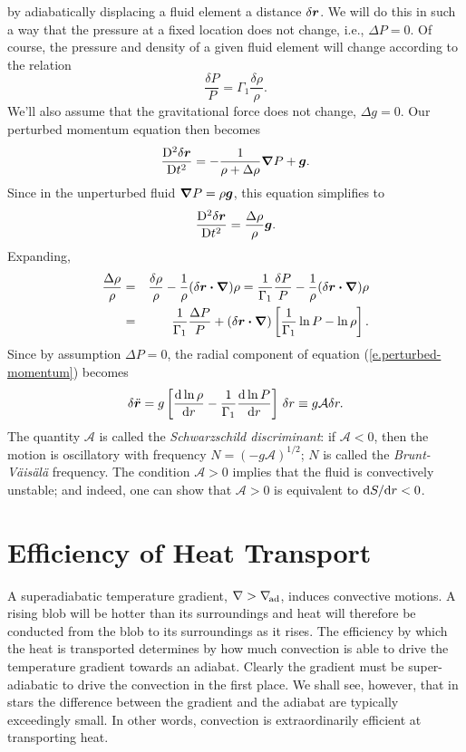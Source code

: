  by adiabatically displacing a fluid element a distance $\delta\bm{r}$.  We will do this in such a way that the pressure at a fixed location does not change, i.e., $\Delta P = 0$. Of course, the pressure and density of a given fluid element will change according to the relation
\[
\frac{\delta P}{P} = \Gamma_{1}\frac{\delta\rho}{\rho}.
\]
We'll also assume that the gravitational force does not change, $\Delta g = 0$.  Our perturbed momentum equation then becomes
\[
\frac{\mathrm{D}^{2}\delta\bm{r}}{\mathrm{D} t^{2}} = -\frac{1}{\rho + \Delta \rho}\bm{\nabla} P+ \bm{g}.
\]
Since in the unperturbed fluid $\bm{\nabla} P = \rho\bm{g}$, this equation simplifies to
\begin{equation}\label{e.perturbed-momentum}
\frac{\mathrm{D}^{2}\delta\bm{r}}{\mathrm{D} t^{2}} = \frac{\Delta \rho}{\rho}\bm{g}.
\end{equation}
Expanding,
\begin{eqnarray*}
\frac{\Delta \rho}{\rho} &=& \frac{\delta \rho}{\rho} - \frac{1}{\rho}(\delta\bm{r}\bm{\cdot}\bm{\nabla})\rho = \frac{1}{\Gamma_{1}}\frac{\delta P}{P} - \frac{1}{\rho}(\delta\bm{r}\bm{\cdot}\bm{\nabla})\rho\\
 &=& \frac{1}{\Gamma_{1}}\frac{\Delta P}{P} + (\delta\bm{r}\bm{\cdot}\bm{\nabla})\left[\frac{1}{\Gamma_{1}}\ln P-\ln \rho\right].
\end{eqnarray*}
Since by assumption $\Delta P = 0$, the radial component of equation (\ref{e.perturbed-momentum}) becomes
\begin{equation}\label{e.blob-eq-of-motion}
\delta\ddot{\bm{r}} = g\left[ \frac{\mathrm{d}\ln\rho}{\mathrm{d} r} - \frac{1}{\Gamma_{1}}\frac{\mathrm{d}\ln P}{\mathrm{d} r} \right] \,\delta r 
	\equiv g \mathcal{A} \delta r.
\end{equation}
The quantity $\mathcal{A}$ is called the \emph{Schwarzschild discriminant}: if $\mathcal{A} < 0$, then the motion is oscillatory with frequency $N = (-g\mathcal{A})^{1/2}$; $N$ is called the \emph{Brunt-V\"ais\"al\"a} frequency. The condition $\mathcal{A} > 0$ implies that the fluid is convectively unstable; and indeed, one can show that $\mathcal{A} > 0$ is equivalent to $\mathrm{d} S/\mathrm{d} r < 0$.

\section{Efficiency of Heat Transport}

A superadiabatic temperature gradient, $\nabla > \nabla_{\!\mathrm{ad}}$, induces convective motions. A rising blob will be hotter than its surroundings and heat will therefore be conducted from the blob to its surroundings as it rises. The efficiency by which the heat is transported determines by how much convection is able to drive the temperature gradient towards an adiabat. Clearly the gradient must be super-adiabatic to drive the convection in the first place. We shall see, however, that in stars the difference between the gradient and the adiabat are typically exceedingly small. In other words, convection is extraordinarily efficient at transporting heat.

